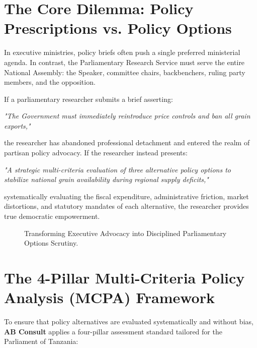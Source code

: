 \documentclass[11pt, a4paper]{report}
\begin{document}
\section{The Core Dilemma: Policy Prescriptions vs. Policy Options}
In executive ministries, policy briefs often push a single preferred ministerial agenda. In contrast, the Parliamentary Research Service must serve the entire National Assembly: the Speaker, committee chairs, backbenchers, ruling party members, and the opposition. 

If a parliamentary researcher submits a brief asserting:
\begin{center}
    \textit{"The Government must immediately reintroduce price controls and ban all grain exports,"}
\end{center}
the researcher has abandoned professional detachment and entered the realm of partisan policy advocacy. If the researcher instead presents:
\begin{center}
    \textit{"A strategic multi-criteria evaluation of three alternative policy options to stabilize national grain availability during regional supply deficits,"}
\end{center}
systematically evaluating the fiscal expenditure, administrative friction, market distortions, and statutory mandates of each alternative, the researcher provides true democratic empowerment.

\begin{figure}[htbp]
  \centering
  \caption{Transforming Executive Advocacy into Disciplined Parliamentary Options Scrutiny.}
  \label{fig:analytical_transition}
\end{figure}

\section{The 4-Pillar Multi-Criteria Policy Analysis (MCPA) Framework}
To ensure that policy alternatives are evaluated systematically and without bias, \textbf{AB Consult} applies a four-pillar assessment standard tailored for the Parliament of Tanzania:
\end{document}
